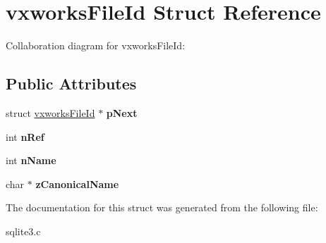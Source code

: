 \hypertarget{structvxworksFileId}{}\section{vxworks\+File\+Id Struct Reference}
\label{structvxworksFileId}


Collaboration diagram for vxworks\+File\+Id\+:
\subsection*{Public Attributes}
\begin{DoxyCompactItemize}
\item 
struct \hyperlink{structvxworksFileId}{vxworks\+File\+Id} $\ast$ {\bfseries p\+Next}\hypertarget{structvxworksFileId_a1941104384e7aa1ad9d8574d091abe3a}{}\label{structvxworksFileId_a1941104384e7aa1ad9d8574d091abe3a}

\item 
int {\bfseries n\+Ref}\hypertarget{structvxworksFileId_a59dde49ee027786a06de8ad59b1d7883}{}\label{structvxworksFileId_a59dde49ee027786a06de8ad59b1d7883}

\item 
int {\bfseries n\+Name}\hypertarget{structvxworksFileId_af7ed9a749d73b74b534bc06baf1abf6d}{}\label{structvxworksFileId_af7ed9a749d73b74b534bc06baf1abf6d}

\item 
char $\ast$ {\bfseries z\+Canonical\+Name}\hypertarget{structvxworksFileId_a032c9aaaa13ff100d9f3cd53926587fe}{}\label{structvxworksFileId_a032c9aaaa13ff100d9f3cd53926587fe}

\end{DoxyCompactItemize}


The documentation for this struct was generated from the following file\+:\begin{DoxyCompactItemize}
\item 
sqlite3.\+c\end{DoxyCompactItemize}
